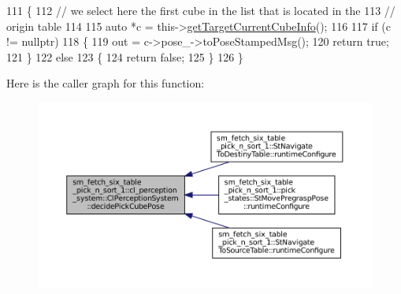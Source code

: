 \begin{DoxyCode}
111             \{
112                 \textcolor{comment}{// we select here the first cube in the list that is located in the}
113                 \textcolor{comment}{// origin table}
114 
115                 \textcolor{keyword}{auto} *c = this->\hyperlink{classsm__fetch__six__table__pick__n__sort__1_1_1cl__perception__system_1_1ClPerceptionSystem_a4103ba8479b122c7af34b3b51102c5d5}{getTargetCurrentCubeInfo}();
116 
117                 \textcolor{keywordflow}{if} (c != \textcolor{keyword}{nullptr})
118                 \{
119                     out = c->pose\_->toPoseStampedMsg();
120                     \textcolor{keywordflow}{return} \textcolor{keyword}{true};
121                 \}
122                 \textcolor{keywordflow}{else}
123                 \{
124                     \textcolor{keywordflow}{return} \textcolor{keyword}{false};
125                 \}
126             \}
\end{DoxyCode}
Here is the caller graph for this function\+:
\nopagebreak
\begin{figure}[H]
\begin{center}
\leavevmode
\includegraphics[width=350pt]{classsm__fetch__six__table__pick__n__sort__1_1_1cl__perception__system_1_1ClPerceptionSystem_ada6bee3141c1a45d1b7a0a74b2d13a7a_icgraph}
\end{center}
\end{figure}
\mbox{\label{classsm__fetch__six__table__pick__n__sort__1_1_1cl__perception__system_1_1ClPerceptionSystem_a553101516ba25a6a9f293e33b4e90dad}} 
